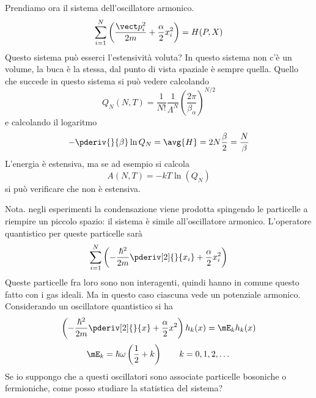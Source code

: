 Prendiamo ora il sistema dell'oscillatore armonico.
\[
\sum_{i = 1}^N \left(\frac{\vect p_i^2}{2 m} + \frac{\alpha}{2} x_i^2 \right) = H(P,X)
\]
Questo sistema può esserci l'estensività voluta? In questo sistema non c'è un volume, la buca è la stessa, dal punto di vista spaziale è sempre quella. Quello che succede in questo sistema si può vedere calcolando
\[
Q_N(N,T) = \frac{1}{N!} \frac{1}{\Lambda^N} \left(\frac{2 \pi}{\beta_{\alpha}}\right)^{N/2}
\]
e calcolando il logaritmo
\[
- \pderiv{}{\beta} \ln Q_N = \avg{H} = 2 N \frac{\beta}{2} = \frac{N}{\beta}
\]
L'energia è estensiva, ma se ad esempio si calcola
\[
A(N,T) = - k T \ln(Q_N)
\]
si può verificare che non è estensiva.

Nota. negli esperimenti la condensazione viene prodotta spingendo le particelle a riempire un piccolo spazio: il sistema è simile all'oscillatore armonico. L'operatore quantistico per queste particelle sarà
\[
\sum_{i = 1}^N \left(- \frac{\hbar^2}{2m} \pderiv[2]{}{x_i} + \frac{\alpha}{2} x_i^2\right)
\]
Queste particelle fra loro sono non interagenti, quindi hanno in comune questo fatto con i gas ideali. Ma in questo caso ciascuna vede un potenziale armonico. Considerando un oscillatore quantistico si ha
\[
\left(- \frac{\hbar^2}{2m} \pderiv[2]{}{x} + \frac{\alpha}{2} x^2 \right) h_k(x) = \mE_k h_k(x)
\]
\[
\mE_k = \hbar \omega \left(\frac{1}{2} + k\right) \qquad k = 0, 1, 2, \dots
\]
Se io suppongo che a questi oscillatori sono associate particelle bosoniche o fermioniche, come posso studiare la statistica del sistema?